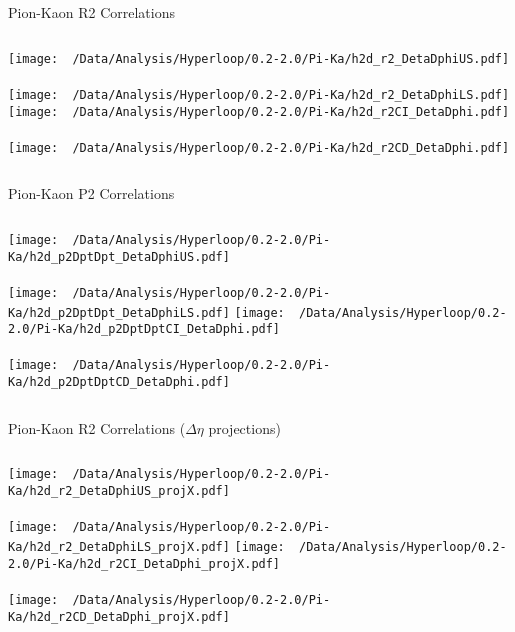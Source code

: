 \documentclass{beamer}
\begin{document}
\begin{frame}{Pion-Kaon R2 Correlations}
	\begin{columns}
		\centering
		\texttt{[image: ~/Data/Analysis/Hyperloop/0.2-2.0/Pi-Ka/h2d\_r2\_DetaDphiUS.pdf]}\\~\\
		\texttt{[image: ~/Data/Analysis/Hyperloop/0.2-2.0/Pi-Ka/h2d\_r2\_DetaDphiLS.pdf]}
		\centering
		\texttt{[image: ~/Data/Analysis/Hyperloop/0.2-2.0/Pi-Ka/h2d\_r2CI\_DetaDphi.pdf]}\\~\\
		\texttt{[image: ~/Data/Analysis/Hyperloop/0.2-2.0/Pi-Ka/h2d\_r2CD\_DetaDphi.pdf]}
	\end{columns}
\end{frame}
\begin{frame}{Pion-Kaon P2 Correlations}
	\begin{columns}
		\column{0.5\linewidth}
		\centering
		\texttt{[image: ~/Data/Analysis/Hyperloop/0.2-2.0/Pi-Ka/h2d\_p2DptDpt\_DetaDphiUS.pdf]}\\~\\
		\texttt{[image: ~/Data/Analysis/Hyperloop/0.2-2.0/Pi-Ka/h2d\_p2DptDpt\_DetaDphiLS.pdf]}
		\column{0.5\linewidth}
		\centering
		\texttt{[image: ~/Data/Analysis/Hyperloop/0.2-2.0/Pi-Ka/h2d\_p2DptDptCI\_DetaDphi.pdf]}\\~\\
		\texttt{[image: ~/Data/Analysis/Hyperloop/0.2-2.0/Pi-Ka/h2d\_p2DptDptCD\_DetaDphi.pdf]}
	\end{columns}
\end{frame}
\begin{frame}{Pion-Kaon R2 Correlations ($\Delta\eta$ projections)}
	\begin{columns}
		\centering
		\texttt{[image: ~/Data/Analysis/Hyperloop/0.2-2.0/Pi-Ka/h2d\_r2\_DetaDphiUS\_projX.pdf]}\\~\\
		\texttt{[image: ~/Data/Analysis/Hyperloop/0.2-2.0/Pi-Ka/h2d\_r2\_DetaDphiLS\_projX.pdf]}
		\centering
		\texttt{[image: ~/Data/Analysis/Hyperloop/0.2-2.0/Pi-Ka/h2d\_r2CI\_DetaDphi\_projX.pdf]}\\~\\
		\texttt{[image: ~/Data/Analysis/Hyperloop/0.2-2.0/Pi-Ka/h2d\_r2CD\_DetaDphi\_projX.pdf]}
	\end{columns}
\end{frame}
\end{document}
